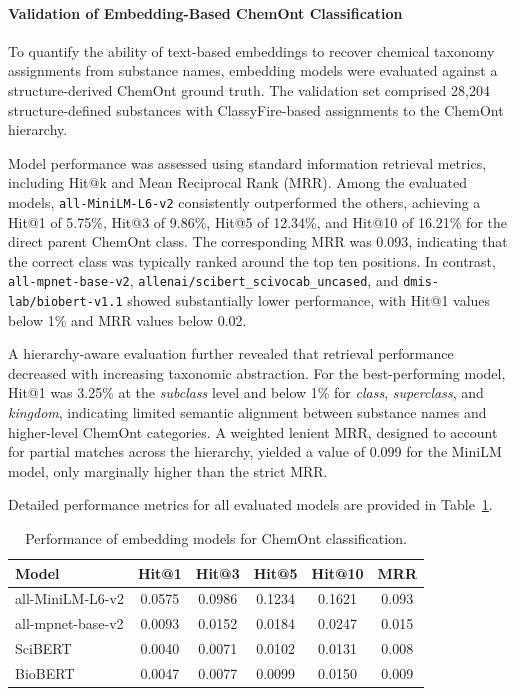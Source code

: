 \paragraph{Validation of Embedding-Based ChemOnt Classification}
\label{sec:chemont_results}

To quantify the ability of text-based embeddings to recover chemical
taxonomy assignments from substance names, embedding models were evaluated
against a structure-derived ChemOnt ground truth. The validation set
comprised 28,204 structure-defined substances with ClassyFire-based
assignments to the ChemOnt hierarchy.

Model performance was assessed using standard information retrieval metrics,
including Hit@k and Mean Reciprocal Rank (MRR). Among the evaluated models,
\texttt{all-MiniLM-L6-v2} consistently outperformed the others, achieving a
Hit@1 of 5.75\%, Hit@3 of 9.86\%, Hit@5 of 12.34\%, and Hit@10 of 16.21\% for
the direct parent ChemOnt class. The corresponding MRR was 0.093, indicating
that the correct class was typically ranked around the top ten positions.
In contrast, \texttt{all-mpnet-base-v2}, \texttt{allenai/scibert\_scivocab\_uncased},
and \texttt{dmis-lab/biobert-v1.1} showed substantially lower performance,
with Hit@1 values below 1\% and MRR values below 0.02.

A hierarchy-aware evaluation further revealed that retrieval performance
decreased with increasing taxonomic abstraction. For the best-performing
model, Hit@1 was 3.25\% at the \emph{subclass} level and below 1\% for
\emph{class}, \emph{superclass}, and \emph{kingdom}, indicating limited
semantic alignment between substance names and higher-level ChemOnt
categories. A weighted lenient MRR, designed to account for partial matches
across the hierarchy, yielded a value of 0.099 for the MiniLM model, only
marginally higher than the strict MRR.

Detailed performance metrics for all evaluated models are provided in
Table~\ref{tab:chemont_validation}.

\begin{table}[!ht]
    \centering
    \caption{Performance of embedding models for ChemOnt classification.}
    \label{tab:chemont_validation}
    \begin{tabular}{lccccc}
        \hline
        Model           & Hit@1  & Hit@3  & Hit@5  & Hit@10 & MRR   \\
        \hline
        all-MiniLM-L6-v2  & 0.0575 & 0.0986 & 0.1234 & 0.1621 & 0.093 \\
        all-mpnet-base-v2 & 0.0093 & 0.0152 & 0.0184 & 0.0247 & 0.015 \\
        SciBERT           & 0.0040 & 0.0071 & 0.0102 & 0.0131 & 0.008 \\
        BioBERT           & 0.0047 & 0.0077 & 0.0099 & 0.0150 & 0.009 \\
        \hline
    \end{tabular}
\end{table}

